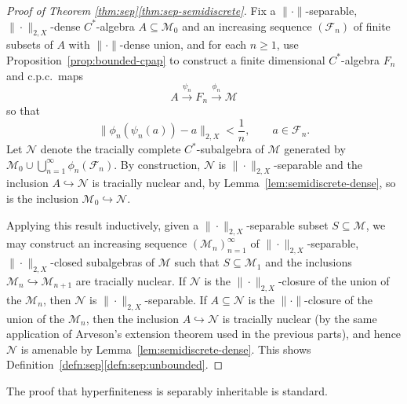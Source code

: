 \documentclass[a4paper,11pt]{amsart}
\theoremstyle{definition}
\numberwithin{equation}{section}
\numberwithin{theorem}{section}
\newcommand{\M}{\mathcal{M}}
\begin{document}
\begin{proof}[Proof of Theorem \ref{thm:sep}\ref{thm:sep-semidiscrete}]
	Fix a $\|\cdot\|$-separable, $\|\cdot\|_{2, X}$-dense $C^*$-algebra $A \subseteq \mathcal M_0$ and an increasing sequence $(\mathcal F_n)$ of finite subsets of $A$ with $\|\cdot\|$-dense union, and for each $n \geq 1$, use Proposition~\ref{prop:bounded-cpap} to construct a finite dimensional $C^*$-algebra $F_n$ and c.p.c.\ maps 
	\begin{equation}
		A \overset{\psi_n}{\longrightarrow} F_n \overset{\phi_n}{\longrightarrow} \mathcal M
	\end{equation}
	so that
	\begin{equation}
		\|\phi_n(\psi_n(a)) - a \|_{2, X} < \frac1n, \qquad a \in \mathcal F_n.
	\end{equation}
	Let $\mathcal N$ denote the tracially complete $C^*$-subalgebra of $\M$ generated by $\mathcal M_0 \cup \bigcup_{n=1}^\infty \phi_n(\mathcal F_n)$.  By construction, $\mathcal N$ is $\|\cdot\|_{2, X}$-separable and the inclusion $A \hookrightarrow \mathcal N$ is tracially nuclear and, by Lemma~\ref{lem:semidiscrete-dense}, so is the inclusion $\mathcal M_0 \hookrightarrow \mathcal N$.
	
	Applying this result inductively, given a $\|\cdot\|_{2, X}$-separable subset $S \subseteq \mathcal M$, we may construct an increasing sequence $(\mathcal M_n)_{n=1}^\infty$ of $\|\cdot\|_{2, X}$-separable, $\|\cdot\|_{2, X}$-closed subalgebras of $\mathcal M$ such that $S \subseteq \mathcal M_1$ and the inclusions $\mathcal M_n \hookrightarrow \mathcal M_{n+1}$ are tracially nuclear.  If $\mathcal N$ is the $\|\cdot\|_{2, X}$-closure of the union of the $\mathcal M_n$, then $\mathcal N$ is $\|\cdot\|_{2, X}$-separable.  If $A \subseteq \mathcal N$ is the $\|\cdot\|$-closure of the union of the $\mathcal M_n$, then the inclusion $A \hookrightarrow \mathcal N$ is tracially nuclear (by the same application of Arveson's extension theorem used in the previous parts), and hence $\mathcal N$ is {}amenable by Lemma~\ref{lem:semidiscrete-dense}.  This shows Definition~\ref{defn:sep}\ref{defn:sep:unbounded}.
\end{proof}

The proof that hyperfiniteness is separably inheritable is standard.
\end{document}
